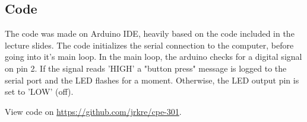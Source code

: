 \documentclass{article}
\begin{document}
\subsection{Code}

The code was made on Arduino IDE, heavily based on the code included in the lecture slides. The code initializes the serial connection to the computer, before going into it's main loop. In the main loop, the arduino checks for a digital signal on pin 2. If the signal reads 'HIGH' a "button press" message is logged to the serial port and the LED flashes for a moment. Otherwise, the LED output pin is set to 'LOW' (off).

View code on \href{GitHub}{https://github.com/jrkre/cpe-301}.
\end{document}
